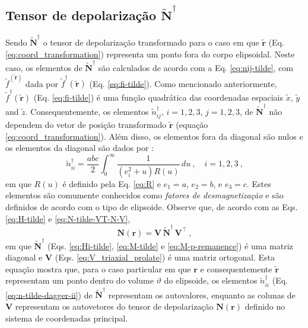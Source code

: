 \subsection{Tensor de depolarização $\tilde{\mathbf{N}}^{\dagger}$}

Sendo $\tilde{\mathbf{N}}^{\dagger}$ o tensor de depolarização transformado para o caso em que $\tilde{\mathbf{r}}$ (Eq. \ref{eq:coord_transformation}) representa um ponto fora do corpo elipsoidal. Neste caso, os elementos de $\tilde{\mathbf{N}}^{\dagger}$ são calculados de acordo com a Eq. \ref{eq:nij-tilde}, com $\tilde{f}^(\tilde{\mathbf{r}})$ dada por $\tilde{f}^{\dagger}(\tilde{\mathbf{r}})$ (Eq. \ref{eq:fi-tilde}). 
Como mencionado anteriormente, $\tilde{f}^{\dagger}(\tilde{\mathbf{r}})$ (Eq. \ref{eq:fi-tilde}) é uma função quadrática das coordenadas espaciais $\tilde{x}$, $\tilde{y}$ and $\tilde{z}$. Consequentemente, os elementos $\tilde{n}^{\dagger}_{ij}$, $i = 1, 2, 3$, $j = 1, 2, 3$, de $\tilde{\mathbf{N}}^{\dagger}$ não dependem do vetor de posição transformado $\tilde{\mathbf{r}}$ (equação \ref{eq:coord_transformation}). Além disso, os elementos fora da diagonal são nulos e os elementos da diagonal são dados por \citep{stoner1945}: 
\begin{equation}
\tilde{n}^{\dagger}_{ii} = \frac{abc}{2}
\int_{0}^{\infty} \frac{1}{\left( e_{i}^{2} 
	+ u \right) R(u)} \, du \: , \quad i = 1, 2, 3 \: ,
\label{eq:n-tilde-dagger-ii}
\end{equation}
em que $R(u)$ é definido pela Eq. \ref{eq:R} e
$e_{1} = a$, $e_{2} = b$, e $e_{3} = c$. Estes elementos são comumente conhecidos como \textit{fatores de desmagnetização} e são definidos de acordo com o tipo de elipsoide. Observe que, de acordo com as Eqs. \ref{eq:H-tilde} e \ref{eq:N-tilde-VT-N-V},
\begin{equation}
\mathbf{N}(\mathbf{r}) = 
\mathbf{V} \, \tilde{\mathbf{N}}^{\dagger} \, 
\mathbf{V}^{\top} \: ,
\label{eq:N-V-N-dagger-VT}
\end{equation}
em que $\tilde{\mathbf{N}}^{\dagger}$ (Eqs. \ref{eq:Hi-tilde}, 
\ref{eq:M-tilde} e \ref{eq:M-p-remanence}) é uma matriz diagonal e $\mathbf{V}$ (Eqs. \ref{eq:V_triaxial_prolate}) é uma matriz ortogonal. Esta equação mostra que, para o caso particular em que $\mathbf{r}$ e consequentemente $\tilde{\mathbf{r}}$ representam um ponto dentro do volume $\vartheta$ do elipsoide, os elementos $\tilde{n}^{\dagger}_{ii}$ (Eq. \ref{eq:n-tilde-dagger-ii})
de $\tilde{\mathbf{N}}^{\dagger}$ representam os autovalores, enquanto as colunas de $\mathbf{V}$ representam os autovetores do tensor de depolarização $\mathbf{N}(\mathbf{r})$ definido no sistema de coordenadas principal.

